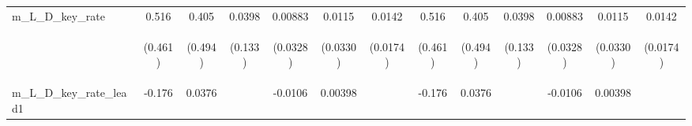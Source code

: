 \documentclass[]{article}
\begin{document}
\begin{center}
\begin{tabular}{lcccccccccccc}
m\_L\_D\_key\_rate & 0.516 & 0.405 & 0.0398 & 0.00883 & 0.0115 & 0.0142 & 0.516 & 0.405 & 0.0398 & 0.00883 & 0.0115 & 0.0142 \\
\vspace{4pt} & \begin{footnotesize}(0.461)\end{footnotesize} & \begin{footnotesize}(0.494)\end{footnotesize} & \begin{footnotesize}(0.133)\end{footnotesize} & \begin{footnotesize}(0.0328)\end{footnotesize} & \begin{footnotesize}(0.0330)\end{footnotesize} & \begin{footnotesize}(0.0174)\end{footnotesize} & \begin{footnotesize}(0.461)\end{footnotesize} & \begin{footnotesize}(0.494)\end{footnotesize} & \begin{footnotesize}(0.133)\end{footnotesize} & \begin{footnotesize}(0.0328)\end{footnotesize} & \begin{footnotesize}(0.0330)\end{footnotesize} & \begin{footnotesize}(0.0174)\end{footnotesize} \\
m\_L\_D\_key\_rate\_lead1 & -0.176 & 0.0376 &  & -0.0106 & 0.00398 &  & -0.176 & 0.0376 &  & -0.0106 & 0.00398 &  \\

\end{tabular}
\end{center}
\end{document}
